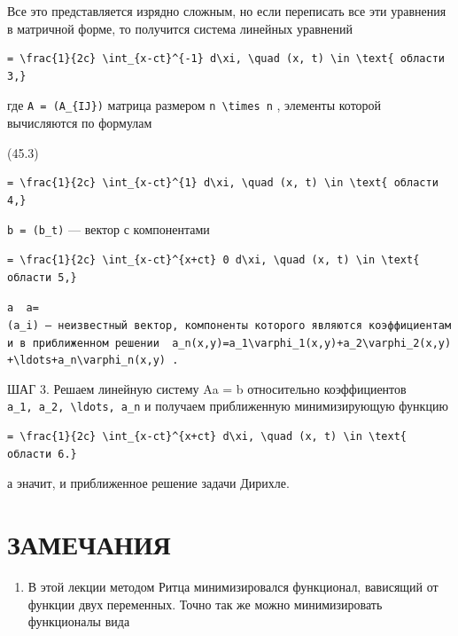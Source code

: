 \documentclass[
  ukrainian,
]{article}
\providecommand{\tightlist}{%
  \setlength{\itemsep}{0pt}\setlength{\parskip}{0pt}}
\begin{document}
Все это представляется изрядно сложным, но если переписать все эти
уравнения в матричной форме, то получится система линейных уравнений

\begin{verbatim}
= \frac{1}{2c} \int_{x-ct}^{-1} d\xi, \quad (x, t) \in \text{ области 3,}
\end{verbatim}

где \texttt{A\ =\ (A\_\{IJ\})} матрица размером
\texttt{n\ \textbackslash{}times\ n} , элементы которой вычисляются по
формулам

(45.3)

\begin{verbatim}
= \frac{1}{2c} \int_{x-ct}^{1} d\xi, \quad (x, t) \in \text{ области 4,}
\end{verbatim}

\texttt{b\ =\ (b\_t)} --- вектор с компонентами

\begin{verbatim}
= \frac{1}{2c} \int_{x-ct}^{x+ct} 0 d\xi, \quad (x, t) \in \text{ области 5,}
\end{verbatim}

\texttt{а\ \ \textquotesingle{}a=(a\_i)\textquotesingle{}\ —\ неизвестный\ вектор,\ компоненты\ которого\ являются\ коэффициентами\ в\ приближенном\ решении\ \ \textquotesingle{}a\_n(x,y)=a\_1\textbackslash{}varphi\_1(x,y)+a\_2\textbackslash{}varphi\_2(x,y)+\textbackslash{}ldots+a\_n\textbackslash{}varphi\_n(x,y)\textquotesingle{}\ .}

ШАГ 3. Решаем линейную систему Aa = b относительно коэффициентов
\texttt{a\_1,\ a\_2,\ \textbackslash{}ldots,\ a\_n} и получаем
приближенную минимизирующую функцию

\begin{verbatim}
= \frac{1}{2c} \int_{x-ct}^{x+ct} d\xi, \quad (x, t) \in \text{ области 6.}
\end{verbatim}

а эначит, и приближенное решение задачи Дирихле.

\section{ЗАМЕЧАНИЯ}\label{ux437ux430ux43cux435ux447ux430ux43dux438ux44f-2}

\begin{enumerate}
\def\labelenumi{\arabic{enumi}.}
\tightlist
\item
  В этой лекции методом Ритца минимизировался функционал, вависящий от
  функции двух переменных. Точно так же можно минимизировать функционалы
  вида
\end{enumerate}
\end{document}
